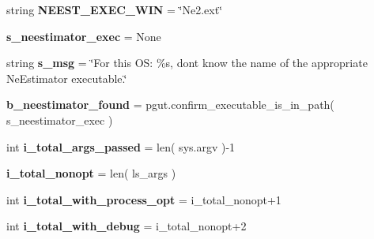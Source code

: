 \begin{DoxyCompactItemize}
\item 
string {\bfseries N\+E\+E\+S\+T\+\_\+\+E\+X\+E\+C\+\_\+\+W\+IN} = \char`\"{}Ne2.\+ext\char`\"{}\hypertarget{namespacenegui_1_1pgdriveneestimator_ab9a64173601ab6062449a6e8b6e5308a}{}\label{namespacenegui_1_1pgdriveneestimator_ab9a64173601ab6062449a6e8b6e5308a}

\item 
{\bfseries s\+\_\+neestimator\+\_\+exec} = None\hypertarget{namespacenegui_1_1pgdriveneestimator_a87418a9e15795bbf6125956bb12a7a53}{}\label{namespacenegui_1_1pgdriveneestimator_a87418a9e15795bbf6125956bb12a7a53}

\item 
string {\bfseries s\+\_\+msg} = \char`\"{}For this O\+S\+: \%s, don\textquotesingle{}t know the name of the appropriate Ne\+Estimator executable.\char`\"{}\hypertarget{namespacenegui_1_1pgdriveneestimator_a167b017a9b7a41a2002208686cc6955e}{}\label{namespacenegui_1_1pgdriveneestimator_a167b017a9b7a41a2002208686cc6955e}

\item 
{\bfseries b\+\_\+neestimator\+\_\+found} = pgut.\+confirm\+\_\+executable\+\_\+is\+\_\+in\+\_\+path( s\+\_\+neestimator\+\_\+exec )\hypertarget{namespacenegui_1_1pgdriveneestimator_accfc8b286ef5aae8dba7bbff499dbc09}{}\label{namespacenegui_1_1pgdriveneestimator_accfc8b286ef5aae8dba7bbff499dbc09}

\item 
int {\bfseries i\+\_\+total\+\_\+args\+\_\+passed} = len( sys.\+argv )-\/1\hypertarget{namespacenegui_1_1pgdriveneestimator_a260ada44506c3d54467676a24ddd64f4}{}\label{namespacenegui_1_1pgdriveneestimator_a260ada44506c3d54467676a24ddd64f4}

\item 
{\bfseries i\+\_\+total\+\_\+nonopt} = len( ls\+\_\+args )\hypertarget{namespacenegui_1_1pgdriveneestimator_aa4e6982ff99236ac13e0af4c4d6e8839}{}\label{namespacenegui_1_1pgdriveneestimator_aa4e6982ff99236ac13e0af4c4d6e8839}

\item 
int {\bfseries i\+\_\+total\+\_\+with\+\_\+process\+\_\+opt} = i\+\_\+total\+\_\+nonopt+1\hypertarget{namespacenegui_1_1pgdriveneestimator_a94c82961d29b7470ac2fab07c882ea51}{}\label{namespacenegui_1_1pgdriveneestimator_a94c82961d29b7470ac2fab07c882ea51}

\item 
int {\bfseries i\+\_\+total\+\_\+with\+\_\+debug} = i\+\_\+total\+\_\+nonopt+2\hypertarget{namespacenegui_1_1pgdriveneestimator_a016de539b454a69f16a92dd281f1e59d}{}\label{namespacenegui_1_1pgdriveneestimator_a016de539b454a69f16a92dd281f1e59d}

\end{DoxyCompactItemize}


